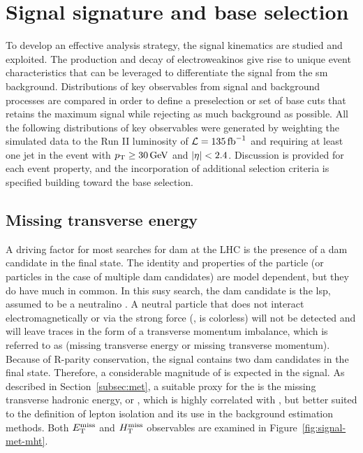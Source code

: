 \clearpage
\section{Signal signature and base selection}
\label{sec:signal-signature}

To develop an effective analysis strategy, the signal kinematics are studied and exploited. The production and decay of electroweakinos give rise to unique event characteristics that can be leveraged to differentiate the signal from the \gls{sm} background. Distributions of key observables from signal and background processes are compared in order to define a preselection or set of base cuts that retains the maximum signal while rejecting as much background as possible. All the following distributions of key observables were generated by weighting the simulated data to the Run II luminosity of $\mathcal{L} = 135 \mbox{\ensuremath{\,\text{fb}^{-1}}}$ and requiring at least one jet in the event with $p_{\mathrm{T}} \geq 30\,\text{Ge\hspace{-.08em}V}$ and $\abs{\eta}<2.4$. Discussion is provided for each event property, and the incorporation of additional selection criteria is specified building toward the base selection. 

\subsection{Missing transverse energy}
\label{subsec:signal-met-mht}

A driving factor for most searches for \gls{dam} at the LHC is the presence of a \gls{dam} candidate in the final state. The identity and properties of the particle (or particles in the case of multiple \gls{dam} candidates) are model dependent, but they do have much in common. In this \gls{susy} search, the \gls{dam} candidate is the \gls{lsp}, assumed to be a neutralino \neuto. A neutral particle that does not interact electromagnetically or via the strong force (\ie, is colorless) will not be detected and will leave traces in the form of a transverse momentum imbalance, which is referred to as \MET (missing transverse energy or missing transverse momentum). Because of R-parity conservation, the signal contains two \gls{dam} candidates in the final state. Therefore, a considerable magnitude of \MET is expected in the signal. As described in Section~\ref{subsec:met}, a suitable proxy for the \MET is the missing transverse hadronic energy, or \mht, which is highly correlated with \MET, but better suited to the definition of lepton isolation and its use in the background estimation methods. Both $E_{\mathrm{T}}^{\text{miss}}$ and $H_{\mathrm{T}}^{\text{miss}}$ observables are examined in Figure~\ref{fig:signal-met-mht}.


